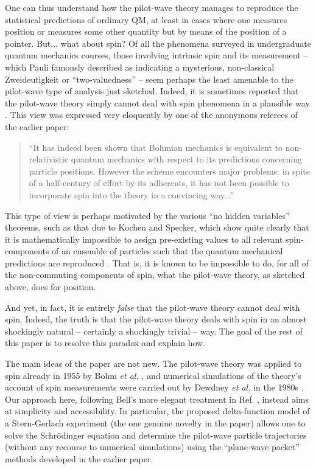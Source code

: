 \documentclass[aps,prc,onecolumn,letterpaper,floatfix,12pt]{revtex4}
\begin{document}
One can thus understand how the pilot-wave
theory manages to reproduce the statistical predictions of ordinary
QM, at least in cases where one measures position or measures some
other quantity but by means of the position of a pointer.  But... what
about spin?  Of all the phenomena surveyed in undergraduate quantum
mechanics courses, those involving intrinsic spin and its measurement
-- which Pauli famously described as indicating a mysterious,
non-classical Zweideutigkeit or ``two-valuedness'' \cite{pauli} -- 
seem perhaps the least amenable to the pilot-wave type of analysis
just sketched.  Indeed, it is sometimes reported that the pilot-wave
theory simply cannot deal with spin phenomena in a plausible way \cite{motl}.  
This view was expressed very eloquently by one of the anonymous
referees of the earlier paper:
\begin{quote}
``It has indeed been shown that Bohmian
mechanics is equivalent to non-relativistic quantum mechanics with
respect to its predictions concerning particle positions. However the
scheme encounters major problems: in spite of a half-century of effort
by its adherents, it has not been possible to incorporate spin into
the theory in a convincing way...''   
\end{quote}
This type of view is perhaps
motivated by the various ``no hidden variables'' theorems, such as
that due to Kochen and Specker, which show quite clearly that it is mathematically
impossible to assign pre-existing values to all relevant 
spin-components of an ensemble of particles such that the quantum
mechanical predictions are reproduced \cite{ks,mermin}.  
That is, it is known to be
impossible to do, for all of the non-commuting components of spin, 
what the pilot-wave theory, as sketched above, does for position.  

And yet, in fact, it is entirely \emph{false} that the pilot-wave
theory cannot deal with spin.  Indeed, the truth is that the
pilot-wave theory deals with spin in an almost shockingly natural --
certainly a shockingly trivial -- way.  The goal of the rest of this
paper is to resolve this paradox and explain how.

The main ideas of the paper are not new.  The pilot-wave theory was
applied to spin already in 1955 by Bohm \emph{et al.} \cite{bst}, and
numerical simulations of the theory's account of spin measurements
were carried out by Dewdney \emph{et al.} in the 1980s \cite{dhk}.  
Our approach here, following Bell's more elegant treatment in Ref. \cite{bellspin},
instead aims at simplicity and accessibility.  In particular, the
proposed delta-function model
of a Stern-Gerlach experiment (the one genuine novelty in the paper) 
allows one to solve the Schr\"odinger equation
and determine the pilot-wave particle trajectories (without any
recourse to numerical simulations) using the ``plane-wave packet'' 
methods developed in the earlier paper.
\end{document}

